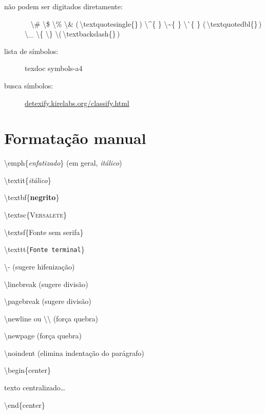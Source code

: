 \documentclass[11pt,twoside,english,brazilian]{article}
\begin{document}
\begin{multicols}{3}
\begin{description}
  \item[não podem ser digitados diretamente:]~\vspace{2pt}\newline
    \null\quad\textbackslash{}\#
    \quad\textbackslash{}\$
    \quad\textbackslash{}\%
    \quad\textbackslash{}\&
    \quad\textquotesingle{}\enspace (\,\textbackslash{}textquotesingle\{\}\,)
    \vspace{2pt}\newline
    \null\quad\textbackslash{}\^{ }\{ \}
    \quad\textbackslash{}\~{ }\{ \}
    \quad\textbackslash{}\`{ }\{ \}
    \quad\textquotedbl{}\enspace (\,\textbackslash{}textquotedbl\{\}\,)
    \vspace{2pt}\newline
    \null\quad\textbackslash{}\_
    \quad\textbackslash{}\{
    \quad\textbackslash{}\}
    \quad\textbackslash{}\enspace (\,\textbackslash{}textbackslash\{\}\,)
\end{description}


\vspace{\baselineskip}


\begin{description}
  \item[lista de símbolos:] \textsf{texdoc symbols-a4}
  \item[busca símbolos:] \url{detexify.kirelabs.org/classify.html}
\end{description}

\section*{Formatação manual}

\textbackslash{}emph\{\emph{enfatizado}\} (em geral, \textit{itálico})

\textbackslash{}textit\{\textit{itálico}\}

\textbackslash{}textbf\{\textbf{negrito}\}

\textbackslash{}textsc\{\textsc{Versalete}\}

\textbackslash{}textsf\{\textsf{Fonte sem serifa}\}

\textbackslash{}texttt\{\texttt{Fonte terminal}\}

\textbackslash{}- (sugere hifenização)

\textbackslash{}linebreak (sugere divisão)

\textbackslash{}pagebreak (sugere divisão)

\textbackslash{}newline ou \textbackslash\textbackslash{} (força quebra)

\textbackslash{}newpage (força quebra)

\textbackslash{}noindent (elimina indentação do parágrafo)

\textbackslash{}begin\{center\}

\quad texto centralizado\dots

\textbackslash{}end\{center\}

\end{multicols}

\printbibliography[
  title=\refname\label{bibliografia}, %
]
\end{document}

